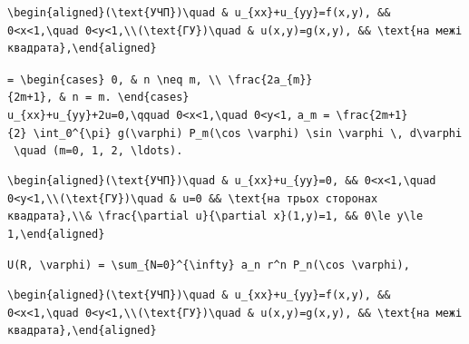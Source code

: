 \documentclass[
  ukrainian,
]{article}
\begin{document}
\begin{verbatim}
\begin{aligned}(\text{УЧП})\quad & u_{xx}+u_{yy}=f(x,y), && 0<x<1,\quad 0<y<1,\\(\text{ГУ})\quad & u(x,y)=g(x,y), && \text{на межі квадрата},\end{aligned}
\end{verbatim}

\texttt{=\ \textbackslash{}begin\{cases\}\ 0,\ \&\ n\ \textbackslash{}neq\ m,\ \textbackslash{}\textbackslash{}\ \textbackslash{}frac\{2a\_\{m\}\}\{2m+1\},\ \&\ n\ =\ m.\ \textbackslash{}end\{cases\}}
\texttt{u\_\{xx\}+u\_\{yy\}+2u=0,\textbackslash{}qquad\ 0\textless{}x\textless{}1,\textbackslash{}quad\ 0\textless{}y\textless{}1,}
\texttt{a\_m\ =\ \textbackslash{}frac\{2m+1\}\{2\}\ \textbackslash{}int\_0\^{}\{\textbackslash{}pi\}\ g(\textbackslash{}varphi)\ P\_m(\textbackslash{}cos\ \textbackslash{}varphi)\ \textbackslash{}sin\ \textbackslash{}varphi\ \textbackslash{},\ d\textbackslash{}varphi\ \textbackslash{}quad\ (m=0,\ 1,\ 2,\ \textbackslash{}ldots).}

\begin{verbatim}
\begin{aligned}(\text{УЧП})\quad & u_{xx}+u_{yy}=0, && 0<x<1,\quad 0<y<1,\\(\text{ГУ})\quad & u=0 && \text{на трьох сторонах квадрата},\\& \frac{\partial u}{\partial x}(1,y)=1, && 0\le y\le 1,\end{aligned}
\end{verbatim}

\texttt{U(R,\ \textbackslash{}varphi)\ =\ \textbackslash{}sum\_\{N=0\}\^{}\{\textbackslash{}infty\}\ a\_n\ r\^{}n\ P\_n(\textbackslash{}cos\ \textbackslash{}varphi),}

\begin{verbatim}
\begin{aligned}(\text{УЧП})\quad & u_{xx}+u_{yy}=f(x,y), && 0<x<1,\quad 0<y<1,\\(\text{ГУ})\quad & u(x,y)=g(x,y), && \text{на межі квадрата},\end{aligned}
\end{verbatim}
\end{document}

